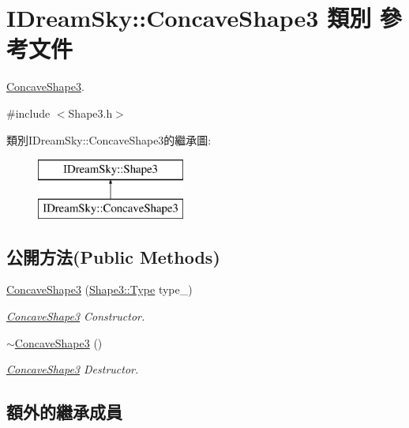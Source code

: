\hypertarget{class_i_dream_sky_1_1_concave_shape3}{}\section{I\+Dream\+Sky\+:\+:Concave\+Shape3 類別 參考文件}
\label{class_i_dream_sky_1_1_concave_shape3}


\hyperlink{class_i_dream_sky_1_1_concave_shape3}{Concave\+Shape3}.  




{\ttfamily \#include $<$Shape3.\+h$>$}

類別\+I\+Dream\+Sky\+:\+:Concave\+Shape3的繼承圖\+:\begin{figure}[H]
\begin{center}
\leavevmode
\includegraphics[height=2.000000cm]{class_i_dream_sky_1_1_concave_shape3}
\end{center}
\end{figure}
\subsection*{公開方法(Public Methods)}
\begin{DoxyCompactItemize}
\item 
\hyperlink{class_i_dream_sky_1_1_concave_shape3_a2ff803ee81fa77aeec02ae99263128f5}{Concave\+Shape3} (\hyperlink{class_i_dream_sky_1_1_shape3_afabf580a0794194e29eb14495ead7ae9}{Shape3\+::\+Type} type\+\_\+)
\begin{DoxyCompactList}\small\item\em \hyperlink{class_i_dream_sky_1_1_concave_shape3}{Concave\+Shape3} Constructor. \end{DoxyCompactList}\item 
\hyperlink{class_i_dream_sky_1_1_concave_shape3_a19c0762d36d914348e7e994ddc2fef9e}{$\sim$\+Concave\+Shape3} ()
\begin{DoxyCompactList}\small\item\em \hyperlink{class_i_dream_sky_1_1_concave_shape3}{Concave\+Shape3} Destructor. \end{DoxyCompactList}\end{DoxyCompactItemize}
\subsection*{額外的繼承成員}


